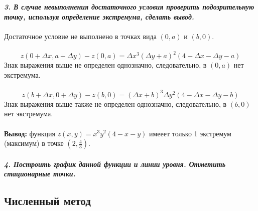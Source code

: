\documentclass[a5paper, 10pt]{article}
\theoremstyle{definition}
\theoremstyle{plain}
\theoremstyle{remark}
\begin{document}
\textit{\textbf{3. В случае невыполнения достаточного условия проверить подозрительную точку, используя определение экстремума, сделать вывод.}}\\
\\
Достаточное условие не выполнено в точках вида  $ \left(0, a \right)$ и $ \left(b, 0 \right)$.\\
\\
\begin{equation}
z\left(0 + \Delta x, a + \Delta y\right) - z \left(0, a \right) =  \Delta x^3\left(\Delta y + a \right)^2(4-\Delta x- \Delta y - a) 
\end{equation}
Знак выражения выше не определен однозначно, следовательно, в $ \left(0, a \right)$ нет экстремума.
\\
\\
\begin{equation}
z\left(b + \Delta x, 0 + \Delta y\right) - z \left(b, 0 \right) =  \left(\Delta x + b \right)^3\Delta y^2(4-\Delta x- \Delta y - b) 
\end{equation}
Знак выражения выше также не определен однозначно, следовательно, в $ \left(b, 0 \right)$ нет экстремума.\\
\\
\textbf{Вывод:} функция $z(x,y) = x^3y^2(4-x-y)$ имееет только 1 экстремум (максимум) в точке $  \left(2, \frac{4}{3}\right)$.
\\
\\








\textit{\textbf{4. Построить график данной функции и линии уровня. Отметить стационарные точки.}}\\



\subsection{Численный метод}
\end{document}
